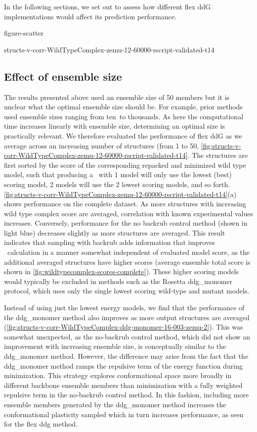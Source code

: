 In the following sections, we set out to assess how different flex ddG implementations would affect its prediction performance.

{figure-scatter}

{structs-v-corr-WildTypeComplex-zemu-12-60000-rscript-validated-t14}

\subsection{Effect of ensemble size}

The results presented above used an ensemble size of 50 members but it is unclear what the optimal ensemble size should be. For example, prior methods used ensemble sizes ranging from ten\cite{kamisetty_accounting_2011}\ to thousands\cite{benedix_predicting_2009}. As here the computational time increases linearly with ensemble size, determining an optimal size is practically relevant. We therefore evaluated the performance of flex ddG as we average across an increasing number of structures (from 1 to 50, \cref{fig:structs-v-corr-WildTypeComplex-zemu-12-60000-rscript-validated-t14}.
The structures are first sorted by the score of the corresponding repacked and minimized wild type model, such that producing a \ddg\ with 1 model will only use the lowest (best) scoring model, 2 models will use the 2 lowest scoring models, and so forth.
\cref{fig:structs-v-corr-WildTypeComplex-zemu-12-60000-rscript-validated-t14}(a) shows performance on the complete dataset.
As more structures with increasing wild type complex score are averaged, correlation with known experimental values increases.
Conversely, performance for the no backrub control method (shown in light blue) decreases slightly as more structures are averaged.
This result indicates that sampling with backrub adds information that improves \ddg\ calculation in a manner somewhat independent of evaluated model score, as the additional averaged structures have higher scores (average ensemble total score is shown in \cref{fig:wildtypecomplex-scores-complete}).
These higher scoring models would typically be excluded in methods such as the Rosetta ddg\_monomer protocol, which uses only the single lowest scoring wild-type and mutant models.

Instead of using just the lowest energy models\cite{kellogg_role_2011}, we find that the performance of the ddg\_monomer method also improves as more output structures are averaged (\cref{fig:structs-v-corr-WildTypeComplex-ddg-monomer-16-003-zemu-2}).
This was somewhat unexpected, as the no-backrub control method, which did not show an improvement with increasing ensemble size, is conceptually similar to the ddg\_monomer method. However, the difference may arise from the fact that the ddg\_monomer method ramps the repulsive term of the energy function during minimization. This strategy explores conformational space more broadly in different backbone ensemble members than minimization with a fully weighted repulsive term in the no-backrub control method. In this fashion, including more ensemble members generated by the ddg\_monomer method increases the conformational plasticity sampled which in turn increases performance, as seen for the flex ddg method.

